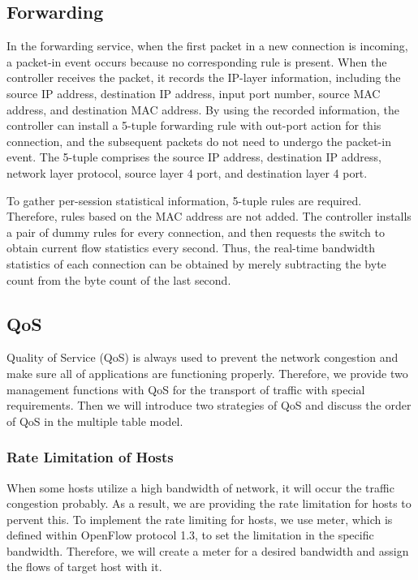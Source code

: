 \documentclass[conference]{IEEEtran}
\begin{document}
\subsection{Forwarding} \label{ssec:forwarding}
In the forwarding service, when the first packet in a new connection is incoming, a packet-in event occurs because no corresponding rule is present.
When the controller receives the packet, it records the IP-layer information, including the source IP address, destination IP address, input port number, source MAC address, and destination MAC address.
By using the recorded information, the controller can install a 5-tuple forwarding rule with out-port action for this connection, and the subsequent packets do not need to undergo the packet-in event.
The 5-tuple comprises the source IP address, destination IP address, network layer protocol, source layer 4 port, and destination layer 4 port.

To gather per-session statistical information, 5-tuple rules are required. Therefore, rules based on the MAC address are not added.
The controller installs a pair of dummy rules for every connection, and then requests the switch to obtain current flow statistics every second.
Thus, the real-time bandwidth statistics of each connection can be obtained by merely subtracting the byte count from the byte count of the last second.



\subsection{QoS}
Quality of Service (QoS) is always used to prevent the network congestion and make sure all of applications are functioning properly. Therefore, we provide two management functions with QoS for the transport of traffic with special requirements. Then we will introduce two strategies of QoS and discuss the order of QoS in the multiple table model.

\subsubsection{Rate Limitation of Hosts}
When some hosts utilize a high bandwidth of network, it will occur the traffic congestion probably.
As a result, we are providing the rate limitation for hosts to pervent this.
To implement the rate limiting for hosts, we use meter, which is defined within OpenFlow protocol 1.3, to set the limitation in the specific bandwidth.
Therefore, we will create a meter for a desired bandwidth and assign the flows of target host with it.
\end{document}
